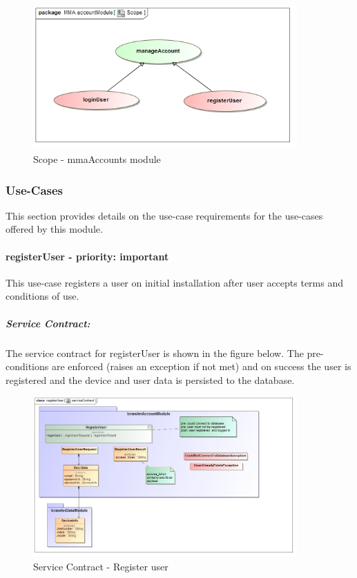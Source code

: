 \documentclass[hidelinks, 12pt, oneside]{article}
\begin{document}
	\begin{figure}[!htbp]
    		\centering
    		\includegraphics[width=0.9\textwidth]{img/scopeAccounts.jpg}
    		\caption{Scope - mmaAccounts module}
    		\label{fig:accountsScope}
		\end{figure}
		
	\subsubsection{Use-Cases}
		This section provides details on the use-case requirements for the use-cases offered by this module.
	\paragraph{registerUser - priority: important}
		This use-case registers a user on initial installation after user accepts terms and conditions of use.
	
	\newpage
	\subparagraph{Service Contract:}
		The service contract for registerUser is shown in the figure below. The pre-conditions are enforced (raises an exception if not met) and on
		success the user is registered and the device and user data is persisted to the database.
		
		\begin{figure}[!htbp]
    		\centering
    		\includegraphics[width=0.9\textwidth]{img/serviceContractRegisterUser.jpg}
    		\caption{Service Contract - Register user}
    		\label{fig:ServiceCon_registerUser}
		\end{figure}
		
\end{document}

